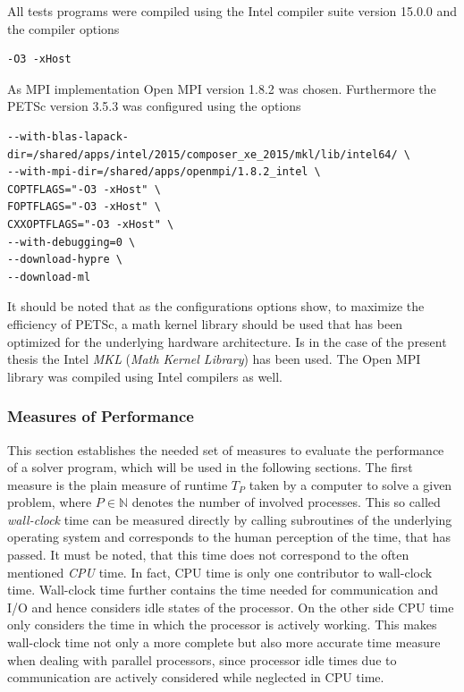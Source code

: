 All tests programs were compiled using the Intel compiler suite version 15.0.0 and the compiler options
\begin{lstlisting}
-O3 -xHost
\end{lstlisting}
As MPI implementation Open MPI version 1.8.2 was chosen. Furthermore the PETSc version 3.5.3 was configured using the options
\begin{lstlisting}
--with-blas-lapack-dir=/shared/apps/intel/2015/composer_xe_2015/mkl/lib/intel64/ \
--with-mpi-dir=/shared/apps/openmpi/1.8.2_intel \
COPTFLAGS="-O3 -xHost" \
FOPTFLAGS="-O3 -xHost" \
CXXOPTFLAGS="-O3 -xHost" \
--with-debugging=0 \
--download-hypre \
--download-ml
\end{lstlisting}
It should be noted that as the configurations options show, to maximize the efficiency of PETSc, a math kernel library should be used that has been optimized for the underlying hardware architecture. Is in the case of the present thesis the Intel \emph{MKL} (\emph{Math Kernel Library}) has been used. The Open MPI library was compiled using Intel compilers as well.

\subsubsection{Measures of Performance}

This section establishes the needed set of measures to evaluate the performance of a solver program, which will be used in the following sections. The first measure is the plain measure of runtime \(T_P\) taken by a computer to solve a given problem, where \(P \in \mathbb{N}\) denotes the number of involved processes. This so called \emph{wall-clock} time can be measured directly by calling subroutines of the underlying operating system and corresponds to the human perception of the time, that has passed. It must be noted, that this time does not correspond to the often mentioned \emph{CPU} time. In fact, CPU time is only one contributor to wall-clock time. Wall-clock time further contains the time needed for communication and I/O and hence considers idle states of the processor. On the other side CPU time only considers the time in which the processor is actively working. This makes wall-clock time not only a more complete but also more accurate time measure when dealing with parallel processors, since processor idle times due to communication are actively considered while neglected in CPU time.

